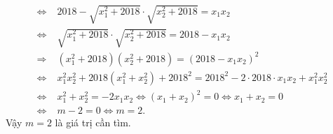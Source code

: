 \begin{bt}
{\begin{enumerate}
\begin{itemize}
{\begin{align*}
\Leftrightarrow\; &2018-\sqrt{x_1^2+2018}\cdot\sqrt{x_2^2+2018}=x_1x_2\\
\Leftrightarrow\; &\sqrt{x_1^2+2018}\cdot\sqrt{x_2^2+2018}=2018-x_1x_2\\
\Rightarrow\; &(x_1^2+2018)(x_2^2+2018)=(2018-x_1x_2)^2\\
\Leftrightarrow\; &x_1^2x_2^2+2018(x_1^2+x_2^2)+2018^2=2018^2-2\cdot 2018\cdot x_1x_2+x_1^2x_2^2\\
\Leftrightarrow\; &x_1^2+x_2^2=-2x_1x_2\Leftrightarrow (x_1+x_2)^2=0\Leftrightarrow x_1+x_2=0\\
\Leftrightarrow\; &m-2=0\Leftrightarrow m=2.
\end{align*}}
Vậy $m=2$ là giá trị cần tìm.
		\end{itemize}
	\end{enumerate}}
\end{bt}
